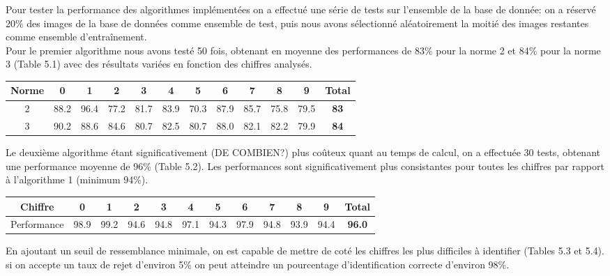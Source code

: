 \documentclass[a4paper,11pt,twoside]{report}
\begin{document}
Pour tester la performance des algorithmes implémentées on a effectué une série de tests sur l'ensemble de la base de donnée: on a réservé 20\% des images de la base de données comme ensemble de test, puis nous avons sélectionné aléatoirement la moitié des images restantes comme ensemble d’entraînement.\\

Pour le premier algorithme nous avons testé 50 fois, obtenant en moyenne des performances de 83\% pour la norme 2 et 84\% pour la norme 3 (Table 5.1) avec des résultats variées en fonction des chiffres analysés.

\begin{center}
\begin{tabular}{ |c||c|c|c|c|c|c|c|c|c|c|c| } 
\hline
 Norme & 0 & 1 & 2 & 3 & 4 & 5 & 6 & 7 & 8 & 9 & \textbf{Total} \\ 
  \hline
  \hline
  2 & 88.2 & 96.4 & 77.2 & 81.7 & 83.9 & 70.3 & 87.9 & 85.7 & 75.8 & 79.5 & \textbf{83} \\
 \hline
  3 & 90.2 & 88.6 & 84.6 & 80.7 & 82.5 & 80.7 & 88.0 & 82.1 & 82.2 & 79.9 & \textbf{84} \\
 \hline
\end{tabular}
\end{center}

Le deuxième algorithme étant significativement (DE COMBIEN?) plus coûteux quant au temps de calcul, on a effectuée 30 tests, obtenant une performance moyenne de 96\% (Table 5.2). Les performances sont significativement plus consistantes pour toutes les chiffres par rapport à l'algorithme 1 (minimum 94\%).

\begin{center}
\begin{tabular}{ |c||c|c|c|c|c|c|c|c|c|c|c| } 
\hline
 Chiffre & 0 & 1 & 2 & 3 & 4 & 5 & 6 & 7 & 8 & 9 & \textbf{Total} \\ 
  \hline
  \hline
  Performance & 98.9 & 99.2 & 94.6 & 94.8 & 97.1 & 94.3 & 97.9 & 94.8 & 93.9 & 94.4 & \textbf{96.0} \\ 
\hline
\end{tabular}
\end{center}

En ajoutant un seuil de ressemblance minimale, on est capable de mettre de coté les chiffres les plus difficiles à identifier (Tables 5.3 et 5.4). si on accepte un taux de rejet d'environ 5\% on peut atteindre un pourcentage d'identification correcte d'environ 98\%.
\end{document}
